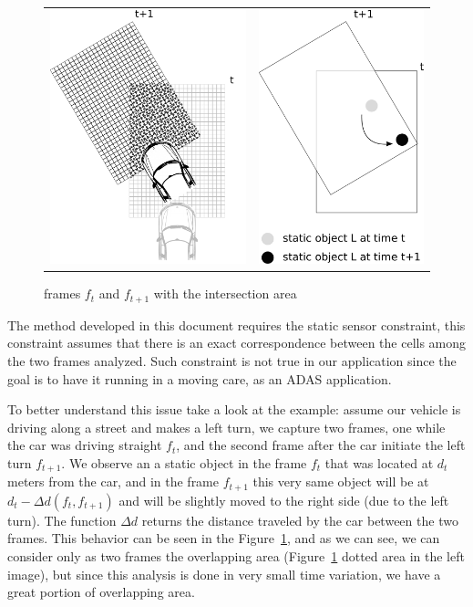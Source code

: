 \begin{figure}[h]
   \centering
     \begin{tabular}{lr}
       \includegraphics[width=0.35\columnwidth]{img/fig:motion:algorithm:nonstatic:01}
       & \includegraphics[width=0.3\columnwidth]{img/fig:motion:algorithm:nonstatic:02}
     \end{tabular}
   \caption{frames $f_t$ and $f_{t+1}$ with the intersection area}
   \label{fig:motion:algorithm:nonstatic:01}
 \end{figure}

The method developed in this document requires the static sensor constraint, this constraint assumes that there is an exact correspondence between the cells among the two frames analyzed. Such constraint is not true in our application since the goal is to have it running in a moving care, as an ADAS application. 

To better understand this issue take a look at the example: assume our vehicle is driving along a street and makes a left turn, we capture two frames, one while the car was driving straight $f_t$, and the second frame  after the car initiate the left turn $f_{t+1}$. We observe an a static object in the frame $f_t$ that was located at $d_t$ meters from the car, and in the frame $f_{t+1}$ this very same object will be at $d_t-\Delta d(f_t,f_{t+1})$ and will be slightly moved to the right side (due to the left turn). The function $\Delta d$ returns the distance traveled by the car between the two frames. This behavior can be seen in the Figure~\ref{fig:motion:algorithm:nonstatic:01}, and as we can see, we can consider only as two frames the overlapping area (Figure~\ref{fig:motion:algorithm:nonstatic:01} dotted area in the left image), but since this analysis is done in very small time variation, we have a great portion of overlapping area.


